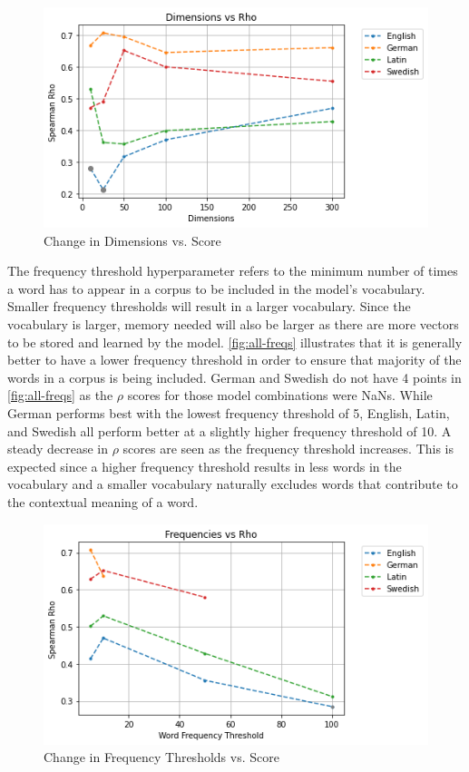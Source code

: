 \begin{figure}[h]
  \centering
  \includegraphics[width=.8\linewidth]{sections/figures/dims_all.png}
  \caption{Change in Dimensions vs. Score}
  \label{fig:all-dims}
\end{figure}

The frequency threshold hyperparameter refers to the minimum number of times a word has to appear in a corpus to be included in the model’s vocabulary. Smaller frequency thresholds will result in a larger vocabulary. Since the vocabulary is larger, memory needed will also be larger as there are more vectors to be stored and learned by the model.  \autoref{fig:all-freqs} illustrates that it is generally better to have a lower frequency threshold in order to ensure that majority of the words in a corpus is being included. German and Swedish do not have 4 points in \autoref{fig:all-freqs} as the $\rho$ scores for those model combinations were NaNs. While German performs best with the lowest frequency threshold of 5, English, Latin, and Swedish all perform better at a slightly higher frequency threshold of 10. A steady decrease in $\rho$ scores are seen as the frequency threshold increases. This is expected since a higher frequency threshold results in less words in the vocabulary and a smaller vocabulary naturally excludes words that contribute to the contextual meaning of a word. 

\begin{figure}[h]
  \centering
  \includegraphics[width=.8\linewidth]{sections/figures/freqs_all.png}
  \caption{Change in Frequency Thresholds vs. Score}
  \label{fig:all-freqs}
\end{figure}

